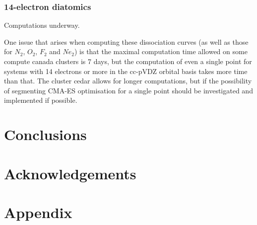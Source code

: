\documentclass[twoside,twocolumn,9pt]{article}
\renewcommand{\refname}{Notes and references}
\begin{document}
\subsubsection{14-electron diatomics}
Computations underway.

One issue that arises when computing these dissociation curves (as well as those for $N_2$, $O_2$, $F_2$ and $Ne_2$) is that the maximal computation time allowed on some compute canada clusters is 7 days, but the computation of even a single point for systems with 14 electrons or more in the cc-pVDZ orbital basis takes more time than that. The cluster cedar allows for longer computations, but if the possibility of segmenting CMA-ES optimisation for a single point should be investigated and implemented if possible. 

\section{Conclusions}

\section{Acknowledgements}

\section{Appendix}



\balance


\end{document}
